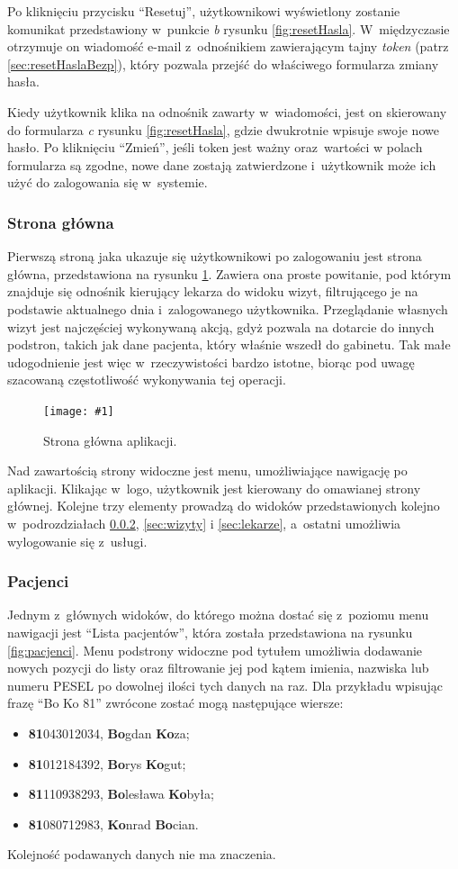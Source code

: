 \documentclass[11pt]{aghdpl}
\newcommand{\fullWidthPicture}[2]{
\begin{figure}[h!]
	\centering
		\texttt{[image: \#1]}
	\caption{#2}
	\label{fig:#1}
\end{figure}
}
\begin{document}
Po kliknięciu przycisku ``Resetuj'', użytkownikowi wyświetlony zostanie komunikat przedstawiony w~punkcie \emph{b} rysunku \ref{fig:resetHasla}. W~międzyczasie otrzymuje on wiadomość e-mail z~odnośnikiem zawierającym tajny \emph{token} (patrz \ref{sec:resetHaslaBezp}), który pozwala przejść do właściwego formularza zmiany hasła.

Kiedy użytkownik klika na odnośnik zawarty w~wiadomości, jest on skierowany do formularza \emph{c} rysunku \ref{fig:resetHasla}, gdzie dwukrotnie wpisuje swoje nowe hasło. Po kliknięciu ``Zmień'', jeśli token jest ważny oraz~wartości w polach formularza są zgodne, nowe dane zostają zatwierdzone i~użytkownik może ich użyć do zalogowania się w~systemie.

\subsubsection{Strona główna}

Pierwszą stroną jaka ukazuje się użytkownikowi po zalogowaniu jest strona główna, przedstawiona na rysunku \ref{fig:home}. Zawiera ona proste powitanie, pod którym znajduje się odnośnik kierujący lekarza do widoku wizyt, filtrującego je na podstawie aktualnego dnia i~zalogowanego użytkownika. Przeglądanie własnych wizyt jest najczęściej wykonywaną akcją, gdyż pozwala na dotarcie do innych podstron, takich jak dane pacjenta, który właśnie wszedł do gabinetu. Tak małe udogodnienie jest więc w~rzeczywistości bardzo istotne, biorąc pod uwagę szacowaną częstotliwość wykonywania tej operacji.

\fullWidthPicture{home}{Strona główna aplikacji.}

Nad zawartością strony widoczne jest menu, umożliwiające nawigację po aplikacji. Klikając w~logo, użytkownik jest kierowany do omawianej strony głównej. Kolejne trzy elementy prowadzą do widoków przedstawionych kolejno w~podrozdziałach \ref{sec:pacjenci}, \ref{sec:wizyty} i \ref{sec:lekarze}, a~ostatni umożliwia wylogowanie się z~usługi.

\subsubsection{Pacjenci}
\label{sec:pacjenci}

Jednym z~głównych widoków, do którego można dostać się z~poziomu menu nawigacji jest ``Lista pacjentów'', która została przedstawiona na rysunku \ref{fig:pacjenci}. Menu podstrony widoczne pod tytułem umożliwia dodawanie nowych pozycji do listy oraz filtrowanie jej pod kątem imienia, nazwiska lub numeru PESEL po dowolnej ilości tych danych na raz. Dla przykładu wpisując frazę ``Bo Ko 81'' zwrócone zostać mogą następujące wiersze:
\begin{itemize}
	\item \textbf{81}043012034, \textbf{Bo}gdan \textbf{Ko}za;
	\item \textbf{81}012184392, \textbf{Bo}rys \textbf{Ko}gut;
	\item \textbf{81}110938293, \textbf{Bo}lesława \textbf{Ko}była;
	\item \textbf{81}080712983, \textbf{Ko}nrad \textbf{Bo}cian.
\end{itemize}
Kolejność podawanych danych nie ma znaczenia.
\end{document}
